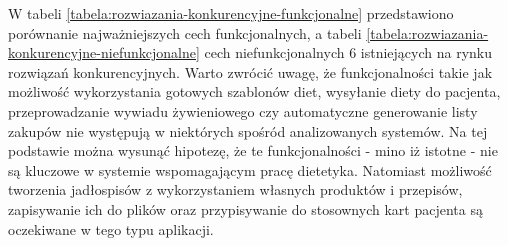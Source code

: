 W tabeli \ref{tabela:rozwiazania-konkurencyjne-funkcjonalne} przedstawiono porównanie najważniejszych cech funkcjonalnych, a tabeli \ref{tabela:rozwiazania-konkurencyjne-niefunkcjonalne} cech niefunkcjonalnych 6 istniejących na rynku rozwiązań konkurencyjnych.
Warto zwrócić uwagę, że funkcjonalności takie jak możliwość wykorzystania gotowych szablonów diet, wysyłanie diety do pacjenta, przeprowadzanie wywiadu żywieniowego czy automatyczne generowanie listy zakupów nie występują w niektórych spośród analizowanych systemów.
Na tej podstawie można wysunąć hipotezę, że te funkcjonalności - mino iż istotne - nie są kluczowe w systemie wspomagającym pracę dietetyka.
Natomiast możliwość tworzenia jadłospisów z wykorzystaniem własnych produktów i przepisów, zapisywanie ich do plików oraz przypisywanie do stosownych kart pacjenta są oczekiwane w tego typu aplikacji.

